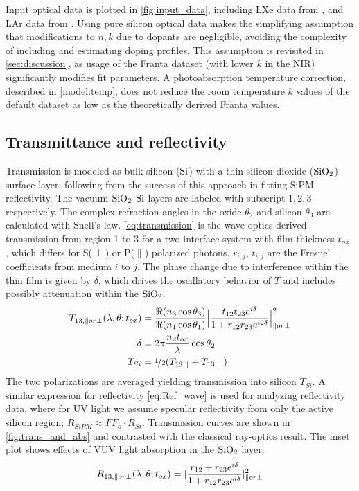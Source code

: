 Input optical data is plotted in \autoref{fig:input_data}, including LXe data from \cite{excitonicBands_lxe_laporte_1977}, \cite{lxe_n_sinnockSmith} and LAr data from \cite{lar_lxe_GRACE2017}. Using pure silicon optical data makes the simplifying assumption that modifications to $n, k$ due to dopants are negligible, avoiding the complexity of including and estimating doping profiles. This assumption is revisited in \autoref{sec:discussion}, as usage of the Franta dataset (with lower $k$ in the NIR) significantly modifies fit parameters. A photoabsorption temperature correction, described in \autoref{model:temp}, does not reduce the room temperature $k$ values of the default dataset as low as the theoretically derived Franta values.

\subsection{Transmittance and reflectivity}
Transmission is modeled as bulk silicon ($\si$) with a thin silicon-dioxide ($\sio$) surface layer, following from the success of this approach in fitting SiPM reflectivity\cite{sipmRef_nexo_guofu}. The vacuum-$\sio$-$\si$ layers are labeled with subscript $1, 2, 3$ respectively. The complex refraction angles in the oxide $\theta_2$ and silicon $\theta_3$ are calculated with Snell's law. \autoref{eq:transmission} is the wave-optics derived transmission from region 1 to 3 for a two interface system with film thickness $t_{ox}$ \cite{kurtis_thesis}, which differs for S($\perp$) or P($\parallel$) polarized photons. $r_{i,j}$, $t_{i,j}$ are the Fresnel coefficients from medium $i$ to $j$. The phase change due to interference within the thin film is given by $\delta$, which drives the oscillatory behavior of $T$ and includes possibly attenuation within the $\sio$. 
\begin{align}
    T_{13, \parallel or \perp} (\lambda, \theta; t_{ox}) &= \frac{\Re (n_3 \cos\theta_3)}{\Re (n_1 \cos\theta_1)} \Big| \frac{t_{12}t_{23}e^{i\delta}}{1 + r_{12}r_{23}e^{i2\delta}} \Big|^2  _{\parallel or \perp}     \label{eq:transmission} \\
    \delta &= 2\pi \frac{n_2 t_{ox}}{\lambda}\cos\theta_2 \\
    T_{Si} &= \nicefrac{1}{2}(T_{13,\parallel} + T_{13, \perp})
\end{align}
The two polarizations are averaged yielding transmission into silicon $T_{Si}$. A similar expression for reflectivity \autoref{eq:Ref_wave} is used for analyzing reflectivity data, where for UV light we assume specular reflectivity from only the active silicon region; $R_{SiPM} \approx FF_o \cdot R_{Si}$. Transmission curves are shown in \autoref{fig:trans_and_abs} and contrasted with the classical ray-optics result. The inset plot shows effects of VUV light absorption in the $\sio$ layer.
\begin{equation}
    R_{13, \parallel or \perp} (\lambda, \theta; t_{ox})= |\frac{r_{12} + r_{23} e^{i \delta}}{1 + r_{12} r_{23} e^{i \delta}} |^2_{\parallel or \perp}
    \label{eq:Ref_wave}
\end{equation}

